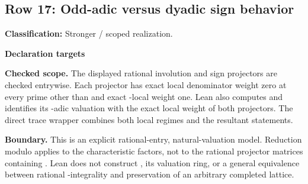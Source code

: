 \subsection{Row 17: Odd-adic versus dyadic sign behavior}
\label{row:17}
\textbf{Classification:} Stronger / scoped realization.
\par\smallskip\textbf{Declaration targets}\par
{\small\noindent{}\par}
{\small\noindent{}\par}
{\small\noindent{}\par}
{\small\noindent{}\par}
{\small\noindent{}\par}
{\small\noindent{}\par}
{\small\noindent{}\par}
{\small\noindent{}\par}
{\small\noindent{}\par}
{\small\noindent{}\par}
{\small\noindent{}\par}
\smallskip\textbf{Checked scope.} The displayed rational  involution and sign projectors are checked entrywise. Each projector has exact local denominator weight zero at every prime other than  and exact -local weight one. Lean also computes  and identifies its -adic valuation with the exact local weight of both projectors. The direct trace wrapper combines both local regimes and the resultant statements.
\par\smallskip\textbf{Boundary.} This is an explicit rational-entry, natural-valuation model. Reduction modulo  applies to the characteristic factors, not to the rational projector matrices containing . Lean does not construct , its valuation ring, or a general equivalence between rational -integrality and preservation of an arbitrary completed lattice.
\medskip
{}
